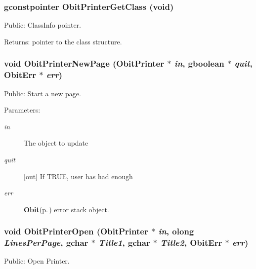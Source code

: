 \subsubsection{\setlength{\rightskip}{0pt plus 5cm}gconstpointer Obit\-Printer\-Get\-Class (void)}\label{ObitPrinter_8h_a12}


Public: Class\-Info pointer. 

\begin{Desc}
\item[Returns:]pointer to the class structure. \end{Desc}
\subsubsection{\setlength{\rightskip}{0pt plus 5cm}void Obit\-Printer\-New\-Page ({\bf Obit\-Printer} $\ast$ {\em in}, gboolean $\ast$ {\em quit}, {\bf Obit\-Err} $\ast$ {\em err})}\label{ObitPrinter_8h_a19}


Public: Start a new page. 

\begin{Desc}
\item[Parameters:]
\begin{description}
\item[{\em in}]The object to update \item[{\em quit}][out] If TRUE, user has had enough \item[{\em err}]{\bf Obit}{\rm (p.\,\pageref{structObit})} error stack object. \end{description}
\end{Desc}
\subsubsection{\setlength{\rightskip}{0pt plus 5cm}void Obit\-Printer\-Open ({\bf Obit\-Printer} $\ast$ {\em in}, {\bf olong} {\em Lines\-Per\-Page}, gchar $\ast$ {\em Title1}, gchar $\ast$ {\em Title2}, {\bf Obit\-Err} $\ast$ {\em err})}\label{ObitPrinter_8h_a15}


Public: Open Printer. 

